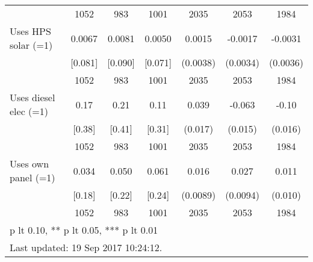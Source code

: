 \begin{table}[htbp]
\begin{tabular*}{1\hsize}{@{\hskip\tabcolsep\extracolsep\fill}l*{1}{cccccc}}
                                &     1052&      983&     1001&     2035         &     2053         &     1984         \\
Uses HPS solar (=1)             &   0.0067&   0.0081&   0.0050&   0.0015         &  -0.0017         &  -0.0031         \\
                                &  [0.081]&  [0.090]&  [0.071]& (0.0038)         & (0.0034)         & (0.0036)         \\
                                &     1052&      983&     1001&     2035         &     2053         &     1984         \\
Uses diesel elec (=1)           &     0.17&     0.21&     0.11&    0.039\sym{**} &   -0.063\sym{***}&    -0.10\sym{***}\\
                                &   [0.38]&   [0.41]&   [0.31]&  (0.017)         &  (0.015)         &  (0.016)         \\
                                &     1052&      983&     1001&     2035         &     2053         &     1984         \\
Uses own panel (=1)             &    0.034&    0.050&    0.061&    0.016\sym{*}  &    0.027\sym{***}&    0.011         \\
                                &   [0.18]&   [0.22]&   [0.24]& (0.0089)         & (0.0094)         &  (0.010)         \\
                                &     1052&      983&     1001&     2035         &     2053         &     1984         \\
\bottomrule
\multicolumn{7}{l}{\footnotesize * p lt 0.10, ** p lt 0.05, *** p lt 0.01}\\
\multicolumn{7}{l}{\footnotesize Last updated: 19 Sep 2017 10:24:12.}\\
\end{tabular*}
\end{table}
